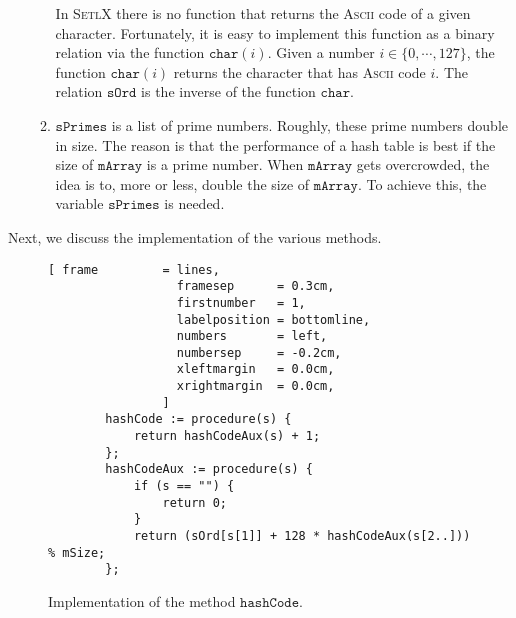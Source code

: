 \begin{enumerate}
\begin{enumerate}
        In \textsc{SetlX} there is no function that returns the \textsc{Ascii} code of a given character.
        Fortunately, it is easy to implement this function as a binary relation via the function
        $\mathtt{char}(i)$.  Given a number $i \in \{0,\cdots,127\}$, the function $\mathtt{char}(i)$
        returns the character that has \textsc{Ascii} code $i$.  The relation $\mathtt{sOrd}$ is the inverse
        of the function $\mathtt{char}$.
  \item $\mathtt{sPrimes}$ is a list of prime numbers.  Roughly, these prime numbers double in size.
        The reason is that the performance of a hash table is best if the size of $\mathtt{mArray}$ is a
        prime number.  When $\mathtt{mArray}$ gets overcrowded, the idea is to, more or less, double
        the size of $\mathtt{mArray}$.  To achieve this, the variable $\mathtt{sPrimes}$ is needed.
  \end{enumerate}
\end{enumerate}
Next, we discuss the implementation of the various methods.

\begin{figure}[!ht]
\centering
\begin{Verbatim}[ frame         = lines, 
                  framesep      = 0.3cm, 
                  firstnumber   = 1,
                  labelposition = bottomline,
                  numbers       = left,
                  numbersep     = -0.2cm,
                  xleftmargin   = 0.0cm,
                  xrightmargin  = 0.0cm,
                ]
        hashCode := procedure(s) {
            return hashCodeAux(s) + 1;
        };
        hashCodeAux := procedure(s) {
            if (s == "") {
                return 0;
            }
            return (sOrd[s[1]] + 128 * hashCodeAux(s[2..])) % mSize;
        };
\end{Verbatim}
\vspace*{-0.3cm}
\caption{Implementation of the method $\mathtt{hashCode}$.}
\label{fig:hashTable.stlx-hashCode}
\end{figure}

